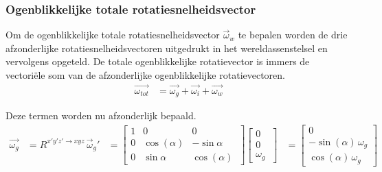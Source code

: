 \subsubsection{Ogenblikkelijke totale rotatiesnelheidsvector}
Om de ogenblikkelijke totale rotatiesnelheidsvector $\overrightarrow{\omega}_{w}$ te bepalen worden de drie afzonderlijke rotatiesnelheidsvectoren uitgedrukt in het wereldassenstelsel en vervolgens opgeteld. De totale ogenblikkelijke rotatievector is immers de vectori\"ele som van de afzonderlijke ogenblikkelijke rotatievectoren.\\
\begin{equation}
\begin{split}
\overrightarrow{\omega_{tot}}
&=\overrightarrow{\omega_{g}}+\overrightarrow{\omega_{i}}+\overrightarrow{\omega_{w}}
\end{split}
\end{equation}



Deze termen worden nu afzonderlijk bepaald.
\begin{equation*}
\begin{split}
\overrightarrow{\omega_{g}}
&=R^{x'y'z' \rightarrow xyz}\,\overrightarrow{\omega}_{g}'
&=	  \begin{bmatrix}
      1 & 0 & 0\\
      0 & \cos(\alpha) & -\sin{\alpha}\\ 
      0 & \sin{\alpha} & \cos(\alpha)\
      \end{bmatrix}
      \begin{bmatrix}
      0\\
      0\\
      \omega_{g}\
      \end{bmatrix}     
&=	  \begin{bmatrix}
      0\\
      -\sin(\alpha)\,\omega_{g}\\
      \cos(\alpha)\,\omega_{g}\
      \end{bmatrix}
\end{split}
\end{equation*}

